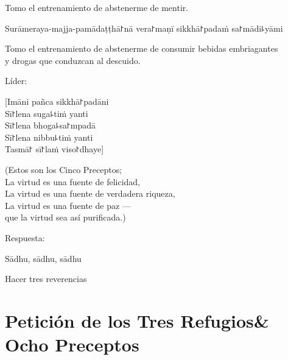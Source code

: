 \enlargethispage{\baselineskip}

\begin{english}
  Tomo el entrenamiento de abstenerme de mentir.
\end{english}

\clearpage

\begin{precept}
  \setcounter{enumi}{4}
  \item Surāmeraya-majja-pamādaṭṭhā꜓nā vera꜓maṇī sikkhā꜓padaṁ sa꜓mādi꜕yāmi
\end{precept}

\begin{english}
  Tomo el entrenamiento de abstenerme de consumir bebidas embriagantes\\
  y drogas que conduzcan al descuido.
\end{english}

\begin{instruction}
  Líder:
\end{instruction}

[Imāni pañca sikkhā꜓padāni\\
Sī꜓lena suga꜕tiṁ yanti\\
Sī꜓lena bhoga꜕sa꜓mpadā\\
Sī꜓lena nibbu꜕tiṁ yanti\\
Tasmā꜓ sī꜓laṁ viso꜓dhaye]

\begin{english}
  (Estos son los Cinco Preceptos;\\
  La virtud es una fuente de felicidad,\\
  La virtud es una fuente de verdadera riqueza,\\
  La virtud es una fuente de paz ---\\
  que la virtud sea así purificada.)
\end{english}

\begin{instruction}
  Respuesta:
\end{instruction}

Sādhu, sādhu, sādhu

\begin{instruction}
  Hacer tres reverencias
\end{instruction}

\clearpage
\chapter[Tres Refugios \& Ocho Preceptos]{Petición de los Tres Refugios\newline \& Ocho Preceptos}


